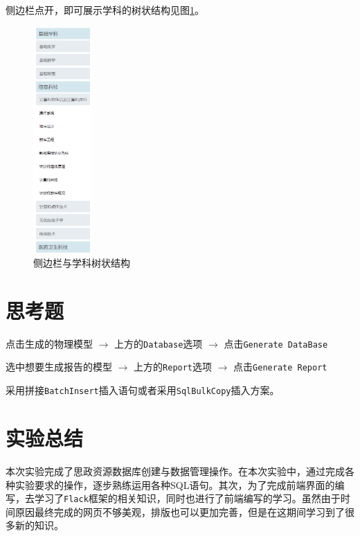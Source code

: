 \documentclass[11pt]{article}
\begin{document}
  侧边栏点开，即可展示学科的树状结构见图\ref{fig:sideitem}。
  \begin{figure}[h]
    \centering
    \includegraphics[width=0.2\textwidth]{sideitem.png}
    \caption{侧边栏与学科树状结构}
    \label{fig:sideitem}
  \end{figure}


  \pagebreak

  \section{思考题}

  点击生成的物理模型  $\rightarrow$ 上方的\verb|Database|选项 $\rightarrow$ 点击\verb|Generate DataBase|


  选中想要生成报告的模型 $\rightarrow$ 上方的\verb|Report|选项 $\rightarrow$ 点击\verb|Generate Report|


  采用拼接\verb|BatchInsert|插入语句或者采用\verb|SqlBulkCopy|插入方案。

  \pagebreak
  \section{实验总结}
  本次实验完成了思政资源数据库创建与数据管理操作。在本次实验中，通过完成各种实验要求的操作，逐步熟练运用各种SQL语句。其次，为了完成前端界面的编写，去学习了\verb|Flack|框架的相关知识，同时也进行了前端编写的学习。虽然由于时间原因最终完成的网页不够美观，排版也可以更加完善，但是在这期间学习到了很多新的知识。
\end{document}
